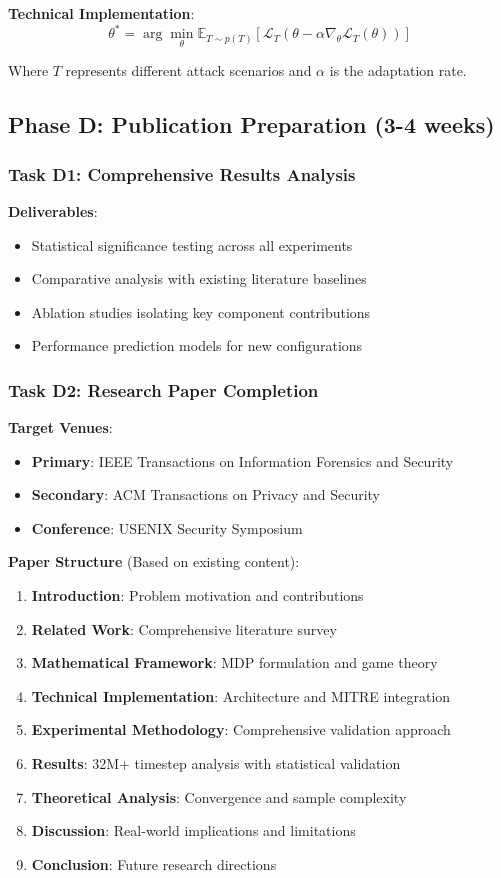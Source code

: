 \documentclass[11pt]{article}
\begin{document}
\textbf{Technical Implementation}:
\begin{equation}
\theta^* = \arg\min_\theta \mathbb{E}_{T \sim p(T)} [\mathcal{L}_T(\theta - \alpha \nabla_\theta \mathcal{L}_T(\theta))]
\end{equation}

Where $T$ represents different attack scenarios and $\alpha$ is the adaptation rate.

\subsection{Phase D: Publication Preparation (3-4 weeks)}

\subsubsection{Task D1: Comprehensive Results Analysis}
\textbf{Deliverables}:
\begin{itemize}
\item Statistical significance testing across all experiments
\item Comparative analysis with existing literature baselines
\item Ablation studies isolating key component contributions
\item Performance prediction models for new configurations
\end{itemize}

\subsubsection{Task D2: Research Paper Completion}
\textbf{Target Venues}:
\begin{itemize}
\item \textbf{Primary}: IEEE Transactions on Information Forensics and Security
\item \textbf{Secondary}: ACM Transactions on Privacy and Security  
\item \textbf{Conference}: USENIX Security Symposium
\end{itemize}

\textbf{Paper Structure} (Based on existing content):
\begin{enumerate}
\item \textbf{Introduction}: Problem motivation and contributions
\item \textbf{Related Work}: Comprehensive literature survey
\item \textbf{Mathematical Framework}: MDP formulation and game theory
\item \textbf{Technical Implementation}: Architecture and MITRE integration
\item \textbf{Experimental Methodology}: Comprehensive validation approach
\item \textbf{Results}: 32M+ timestep analysis with statistical validation
\item \textbf{Theoretical Analysis}: Convergence and sample complexity
\item \textbf{Discussion}: Real-world implications and limitations
\item \textbf{Conclusion}: Future research directions
\end{enumerate}
\end{document}
